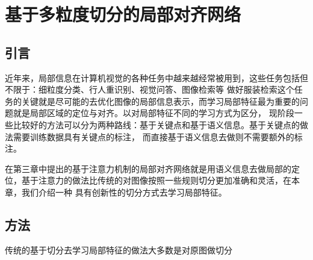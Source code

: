 \chapter{基于多粒度切分的局部对齐网络}

\section{引言}
近年来，局部信息在计算机视觉的各种任务中越来越经常被用到，这些任务包括但不限于：细粒度分类\cite{wang2018learning}、行人重识别\cite{sun2018beyond}、视觉问答、图像检索等
做好服装检索这个任务的关键就是尽可能的去优化图像的局部信息表示，而学习局部特征最为重要的问题就是局部区域的定位与对齐。以对局部特征不同的学习方式为区分，
现阶段一些比较好的方法可以分为两种路线：基于关键点\cite{wei2016convolutional}和基于语义信息\cite{wei2017glad}。基于关键点的做法需要训练数据具有关键点的标注，
而直接基于语义信息去做则不需要额外的标注。

在第三章中提出的基于注意力机制的局部对齐网络就是用语义信息去做局部的定位，基于注意力的做法比传统的对图像按照一些规则切分更加准确和灵活，在本章，我们介绍一种
具有创新性的切分方式去学习局部特征。

\section{方法}
传统的基于切分去学习局部特征的做法大多数是对原图做切分\cite{li2017learning}

